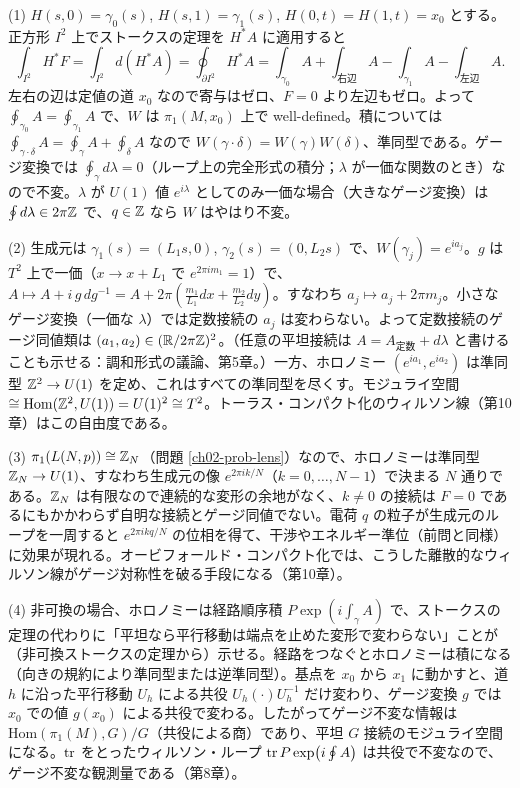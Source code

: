 \begin{solution}
(1) $H(s,0)=\gamma_0(s)$, $H(s,1)=\gamma_1(s)$, $H(0,t)=H(1,t)=x_0$ とする。正方形 $I^2$ 上でストークスの定理を $H^*A$ に適用すると
\[
\int_{I^2}H^*F=\int_{I^2}d(H^*A)=\oint_{\partial I^2}H^*A=\int_{\gamma_0}A+\int_{\text{右辺}}A-\int_{\gamma_1}A-\int_{\text{左辺}}A .
\]
左右の辺は定値の道 $x_0$ なので寄与はゼロ、$F=0$ より左辺もゼロ。よって $\oint_{\gamma_0}A=\oint_{\gamma_1}A$ で、$W$ は $\pi_1(M,x_0)$ 上で well-defined。積については $\oint_{\gamma\cdot\delta}A=\oint_\gamma A+\oint_\delta A$ なので $W(\gamma\cdot\delta)=W(\gamma)W(\delta)$、準同型である。ゲージ変換では $\oint_\gamma d\lambda=0$（ループ上の完全形式の積分；$\lambda$ が一価な関数のとき）なので不変。$\lambda$ が $U(1)$ 値 $e^{i\lambda}$ としてのみ一価な場合（大きなゲージ変換）は $\oint d\lambda\in2\pi\mathbb{Z}$ で、$q\in\mathbb{Z}$ なら $W$ はやはり不変。

(2) 生成元は $\gamma_1(s)=(L_1s,0)$, $\gamma_2(s)=(0,L_2s)$ で、$W(\gamma_j)=e^{ia_j}$。$g$ は $T^2$ 上で一価（$x\to x+L_1$ で $e^{2\pi im_1}=1$）で、$A\mapsto A+i\,g\,dg^{-1}=A+2\pi(\tfrac{m_1}{L_1}dx+\tfrac{m_2}{L_2}dy)$。すなわち $a_j\mapsto a_j+2\pi m_j$。小さなゲージ変換（一価な $\lambda$）では定数接続の $a_j$ は変わらない。よって定数接続のゲージ同値類は $(a_1,a_2)\in(\mathbb{R}/2\pi\mathbb{Z})^2$。（任意の平坦接続は $A=A_{\text{定数}}+d\lambda$ と書けることも示せる：調和形式の議論、第5章。）一方、ホロノミー $(e^{ia_1},e^{ia_2})$ は準同型 $\mathbb{Z}^2\to U(1)$ を定め、これはすべての準同型を尽くす。モジュライ空間 $\cong\mathrm{Hom}(\mathbb{Z}^2,U(1))=U(1)^2\cong T^2$。トーラス・コンパクト化のウィルソン線（第10章）はこの自由度である。

(3) $\pi_1(L(N,p))\cong\mathbb{Z}_N$（問題 \ref{ch02-prob-lens}）なので、ホロノミーは準同型 $\mathbb{Z}_N\to U(1)$、すなわち生成元の像 $e^{2\pi ik/N}$（$k=0,\dots,N-1$）で決まる $N$ 通りである。$\mathbb{Z}_N$ は有限なので連続的な変形の余地がなく、$k\neq0$ の接続は $F=0$ であるにもかかわらず自明な接続とゲージ同値でない。電荷 $q$ の粒子が生成元のループを一周すると $e^{2\pi ikq/N}$ の位相を得て、干渉やエネルギー準位（前問と同様）に効果が現れる。オービフォールド・コンパクト化では、こうした離散的なウィルソン線がゲージ対称性を破る手段になる（第10章）。

(4) 非可換の場合、ホロノミーは経路順序積 $P\exp(i\int_\gamma A)$ で、ストークスの定理の代わりに「平坦なら平行移動は端点を止めた変形で変わらない」ことが（非可換ストークスの定理から）示せる。経路をつなぐとホロノミーは積になる（向きの規約により準同型または逆準同型）。基点を $x_0$ から $x_1$ に動かすと、道 $h$ に沿った平行移動 $U_h$ による共役 $U_h(\cdot)U_h^{-1}$ だけ変わり、ゲージ変換 $g$ では $x_0$ での値 $g(x_0)$ による共役で変わる。したがってゲージ不変な情報は $\mathrm{Hom}(\pi_1(M),G)/G$（共役による商）であり、平坦 $G$ 接続のモジュライ空間になる。$\tr$ をとったウィルソン・ループ $\tr P\exp(i\oint A)$ は共役で不変なので、ゲージ不変な観測量である（第8章）。
\end{solution}

